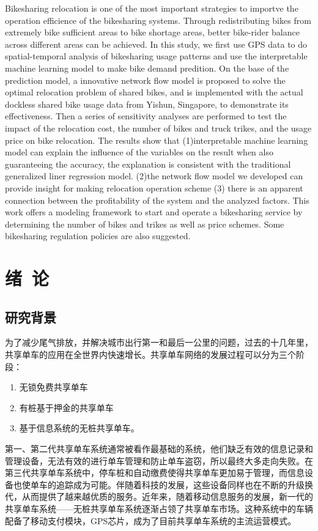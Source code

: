 \documentclass[]{tongjithesis}
\numberwithin{equation}{chapter}
\begin{document}
\begin{eabstract}
	Bikesharing relocation is one of the most important strategies to importve the operation efficience of the bikesharing systems. 
	Through redistributing bikes from extremely bike sufficient areas to bike shortage areas, better bike-rider balance across different areas can be achieved. In this study, we first use GPS data to do spatial-temporal analysis of bikesharing usage patterns and use the interpretable machine learning model to make bike demand predition. On the base of the prediction model, a innovative network flow model is proposed to solve the optimal relocation problem of shared bikes, and is implemented with the actual dockless shared bike usage data from Yishun, Singapore, to demonstrate its effectiveness. Then a series of sensitivity analyses are performed to test the impact of the relocation cost, the number of bikes and truck trikes, and the usage price on bike relocation. The results show that (1)interpretable machine learning model can explain the influence of the variables on the result when also guaranteeing the accuracy, the explanation is consistent with the traditional generalized liner regression model. (2)the network flow model we developed can provide insight for making relocation operation scheme (3) there is an apparent connection between the profitability of the system and the analyzed factors. This work offers a modeling framework to start and operate a bikesharing service by determining the number of bikes and trikes as well as price schemes. Some bikesharing regulation policies are also suggested.
\end{eabstract}

\toc

\mainmatter

\chapter{绪~论}
\section{研究背景}
为了减少尾气排放，并解决城市出行第一和最后一公里的问题，过去的十几年里，共享单车的应用在全世界内快速增长。共享单车网络的发展过程可以分为三个阶段：
\begin{enumerate}
	\item 无锁免费共享单车
	\item 有桩基于押金的共享单车
	\item 基于信息系统的无桩共享单车\cite{demaio2009bike,shaheen2010bikesharing,fishman2016bikeshare}。
\end{enumerate}
第一、第二代共享单车系统通常被看作最基础的系统，他们缺乏有效的信息记录和管理设备，无法有效的进行单车管理和防止单车盗窃，所以最终大多走向失败。在第三代共享单车系统中，停车桩和自动缴费使得共享单车更加易于管理，而信息设备也使单车的追踪成为可能。伴随着科技的发展，这些设备同样也在不断的升级换代，从而提供了越来越优质的服务。近年来，随着移动信息服务的发展，新一代的共享单车系统——无桩共享单车系统逐渐占领了共享单车市场。这种系统中的车辆配备了移动支付模块，GPS芯片，成为了目前共享单车系统的主流运营模式。
\end{document}

